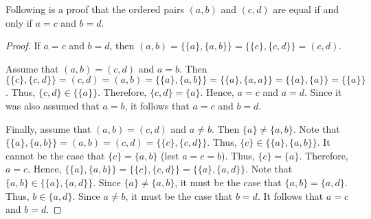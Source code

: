 \documentclass[12pt]{article}
\begin{document}
Following is a proof that the ordered pairs $(a,b)$ and $(c,d)$ are equal if and only if $a=c$ and $b=d$.

\begin{proof}
If $a=c$ and $b=d$, then $(a,b)=\{\{a\},\{a,b\}\}=\{\{c\},\{c,d\}\}=(c,d)$.

Assume that $(a,b)=(c,d)$ and $a=b$.  Then $\{\{c\},\{c,d\}\}=(c,d)=(a,b)=\{\{a\},\{a,b\}\}=\{\{a\},\{a,a\}\}=\{\{a\},\{a\}\}=\{\{a\}\}$.
Thus, $\{c,d\}\in\{\{a\}\}$.  Therefore, $\{c,d\}=\{a\}$.  Hence, $a=c$ and $a=d$.  Since it was also assumed that $a=b$, it follows that $a=c$ and $b=d$.

Finally, assume that $(a,b)=(c,d)$ and $a \neq b$.  Then $\{a\} \neq \{a,b\}$.  Note that $\{\{a\},\{a,b\}\}=(a,b)=(c,d)=\{\{c\},\{c,d\}\}$.  Thus, $\{c\} \in \{\{a\},\{a,b\}\}$.  It cannot be the case that $\{c\}=\{a,b\}$ (lest $a=c=b$).  Thus, $\{c\}=\{a\}$.  Therefore, $a=c$.  Hence, $\{\{a\},\{a,b\}\}=\{\{c\},\{c,d\}\}=\{\{a\},\{a,d\}\}$.  Note that $\{a,b\} \in \{\{a\},\{a,d\}\}$.  Since $\{a\} \neq \{a,b\}$, it must be the case that $\{a,b\}=\{a,d\}$.  Thus, $b \in \{a,d\}$.  Since $a \neq b$, it must be the case that $b=d$.  It follows that $a=c$ and $b=d$.
\end{proof}
\end{document}
